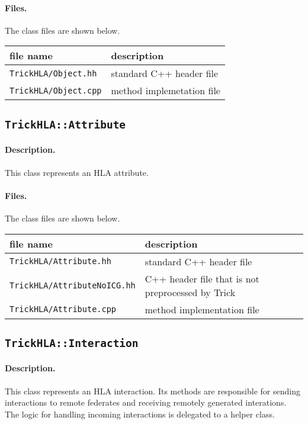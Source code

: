 \paragraph{Files.}
The class files are shown below.
   
{
  \scriptsize
  \begin{tabular}{|l|l|} 
    \hline
    file name & description \\
    \hline \hline
    {\tt TrickHLA/Object.hh} 
    & standard C++ header file
    \\ \hline
    {\tt TrickHLA/Object.cpp} 
    & method implemetation file
    \\ \hline
  \end{tabular}
}

\subsection{{\tt TrickHLA::Attribute}}

\paragraph{Description.}
This class represents an HLA attribute.

\paragraph{Files.}
The class files are shown below.
   
{
  \scriptsize
  \begin{tabular}{|l|l|} 
    \hline
    file name & description \\
    \hline \hline
    {\tt TrickHLA/Attribute.hh} 
    & standard C++ header file
    \\ \hline
    {\tt TrickHLA/AttributeNoICG.hh} 
    & C++ header file that is not preprocessed by Trick
    \\ \hline
    {\tt TrickHLA/Attribute.cpp} 
    & method implementation file
    \\ \hline
  \end{tabular}
}

\subsection{{\tt TrickHLA::Interaction}}

\paragraph{Description.}
This class represents an HLA interaction.
Its methods are responsible for sending interactions to remote federates
and receiving remotely generated interations. 
The logic for handling incoming interactions is delegated to a
helper class.

